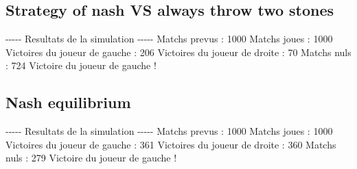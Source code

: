 \documentclass{article}%
\begin{document}
%
\subsection{Strategy of nash VS always throw two stones}%
\label{subsec:Strategy of nash VS always throw two stones}%
{-}{-}{-}{-}{-} Resultats de la simulation {-}{-}{-}{-}{-}\newline%
		\newline%
Matchs prevus : 1000\newline%
Matchs joues : 1000\newline%
\newline%
Victoires du joueur de gauche : 206\newline%
Victoires du joueur de droite : 70\newline%
Matchs nuls : 724\newline%
\newline%
Victoire du joueur de gauche !

%
\subsection{Nash equilibrium}%
\label{subsec:Nash equilibrium}%
{-}{-}{-}{-}{-} Resultats de la simulation {-}{-}{-}{-}{-}\newline%
		\newline%
Matchs prevus : 1000\newline%
Matchs joues : 1000\newline%
\newline%
Victoires du joueur de gauche : 361\newline%
Victoires du joueur de droite : 360\newline%
Matchs nuls : 279\newline%
\newline%
Victoire du joueur de gauche !

%
\end{document}
